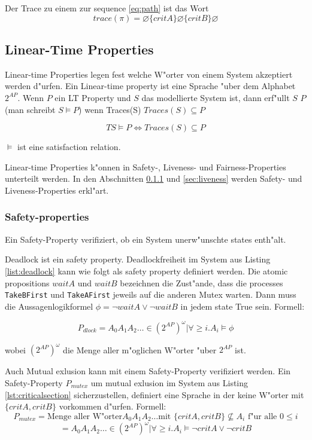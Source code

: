 \documentclass[a4paper, twoside]{article}
\begin{document}
Der Trace zu einem zur sequence \ref{eq:path} ist das Wort
\[
trace(\pi) = \varnothing \{critA\} \varnothing \{critB\} \varnothing
\]

\subsection{Linear-Time Properties}
\label{sec:satisfactionrelations}

Linear-time Properties legen fest welche W"orter von einem System akzeptiert werden d"urfen. Ein Linear-time property ist eine Sprache "uber dem Alphabet $2^{AP}$.
Wenn $P$ ein LT Property und $S$ das modellierte System ist, dann erf"ullt $S$ $P$ (man schreibt $S \models P$) wenn Traces(S) $ Traces(S) \subseteq P $

\[
TS \models P \iff Traces(S) \subseteq P 
\]

$ \models $ ist eine satisfaction relation. 

Linear-time Properties k"onnen in Safety-, Liveness- und Fairness-Properties unterteilt werden. In den Abschnitten \ref{sec:safety} und \ref{sec:liveness} werden Safety- und Liveness-Properties erkl"art.

\subsubsection{Safety-properties}
\label{sec:safety}

Ein Safety-Property verifiziert, ob ein System unerw"unschte states enth"alt. 

Deadlock ist ein safety property. Deadlockfreiheit im System aus Listing \ref{list:deadlock} kann wie folgt als safety property definiert werden. Die atomic propositions $waitA$ und $waitB$ bezeichnen die Zust"ande, dass die processes \verb|TakeBFirst| und \verb|TakeAFirst| jeweils auf die anderen Mutex warten. Dann muss die Aussagenlogikformel  $\phi=\neg waitA \lor \neg waitB$ in jedem state True sein. Formell:

\[
P_{dlock} = {A_0 A_1 A_2 \dots \in (2^{AP})^{\omega} | \forall \geq i.   A_i \models \phi}
\]

wobei $(2^{AP})^{\omega}$ die Menge aller m"oglichen W"orter "uber $2^{AP}$ ist.

Auch Mutual exlusion kann mit einem Safety-Property verifiziert werden. Ein Safety-Property $P_{mutex}$ um mutual exlusion im System aus Listing \ref{lst:criticalsection} sicherzustellen, definiert eine Sprache in der keine W"orter mit $\{critA,critB\}$ vorkommen d"urfen. Formell:
\[
P_{mutex} = \text{Menge aller W"orter} A_0 A_1 A_2 \dots \text{mit } \{critA,critB\} \not \subseteq A_i \text{ f"ur alle } 0 \leq i
\]
\[
 = {A_0 A_1 A_2 \dots \in (2^{AP})^{\omega} | \forall \geq i.   A_i \models \neg critA \lor \neg critB}
\]
\end{document}

